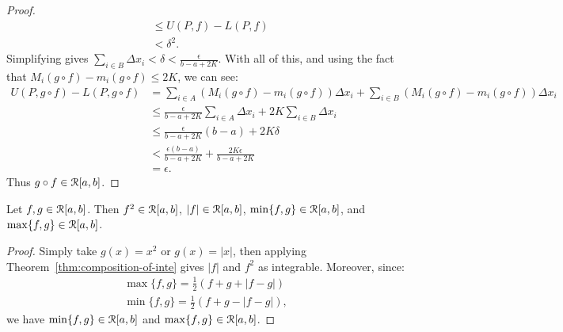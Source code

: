 \documentclass[11pt,twoside,openany]{memoir}
\begin{document}
\begin{proof}
\begin{equation*}
\begin{split}
                    & \leq U(P,f) - L(P,f) \\
                    & < \delta^2.
                \end{split}
                \end{equation*}
            Simplifying gives $\sum_{i \in B}\Delta x_i < \delta < \frac{\epsilon}{b-a + 2K}$. With all of this, and using the fact that $M_{i}(g \circ f) - m_i(g \circ f) \leq 2K$, we can see:
                \begin{equation*}
                \begin{split}
                    U(P,g\circ f) - L(P, g \circ f)
                    & = \sum_{i \in A}(M_i(g \circ f) - m_i(g \circ f))\Delta x_i + \sum_{i \in B}(M_i(g \circ f) - m_i(g \circ f))\Delta x_i\\
                    & \leq \frac{\epsilon}{b-a + 2K}\sum_{i \in A}\Delta x_i + 2K \sum_{i \in B}\Delta x_i \\
                    & \leq \frac{\epsilon}{b-a + 2K} (b-a) + 2K \delta \\
                    & < \frac{\epsilon ( b-a)}{b-a + 2K} + \frac{2K \epsilon}{b-a + 2K} \\
                    & = \epsilon.
                \end{split}
                \end{equation*}
            Thus $g \circ f \in \mathcal{R}[a,b]$.
        \end{proof}

    \begin{corollary}\label{cor:comp-props}
        Let $f,g \in \mathcal{R}[a,b]$. Then $f^2\in \mathcal{R}[a,b]$, $|f| \in \mathcal{R}[a,b]$, $\min\{f,g\} \in \mathcal{R}[a,b]$, and $\max\{f,g\} \in \mathcal{R}[a,b]$.
    \end{corollary}
        \begin{proof}
            Simply take $g(x) = x^2$ or $g(x) = |x|$, then applying Theorem~\ref{thm:composition-of-inte} gives $|f|$ and $f^2$ as integrable. Moreover, since:
                \begin{equation*}
                \begin{split}
                    \max\{f,g\} = \frac{1}{2}(f+g+|f-g|) \\
                    \min\{f,g\} = \frac{1}{2}(f+g - |f-g|),
                \end{split}
                \end{equation*}
            we have $\min\{f,g\} \in \mathcal{R}[a,b]$ and $\max\{f,g\} \in \mathcal{R}[a,b]$.
        \end{proof}
\end{document}
